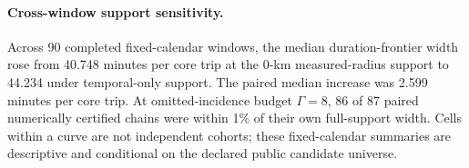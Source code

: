 \paragraph{Cross-window support sensitivity.} Across 90 completed fixed-calendar windows, the median duration-frontier width rose from 40.748 minutes per core trip at the 0-km measured-radius support to 44.234 under temporal-only support. The paired median increase was 2.599 minutes per core trip. At omitted-incidence budget $\Gamma=8$, 86 of 87 paired numerically certified chains were within 1\% of their own full-support width. Cells within a curve are not independent cohorts; these fixed-calendar summaries are descriptive and conditional on the declared public candidate universe.
